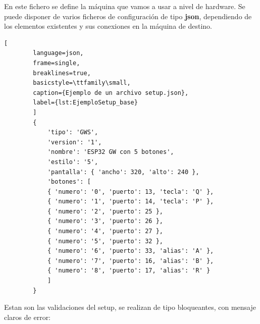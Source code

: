 	En este fichero se define la máquina que vamos a usar a nivel de hardware.
	Se puede disponer de varios ficheros de configuración de tipo \textbf{json}, dependiendo de los elementos existentes y sus conexiones en la máquina de destino. 
		
	\begin{lstlisting}[
		language=json, 
		frame=single, 
		breaklines=true, 
		basicstyle=\ttfamily\small,
		caption={Ejemplo de un archivo setup.json},
		label={lst:EjemploSetup_base}
		]
		{
			'tipo': 'GWS',                                       
			'version': '1',                                   
			'nombre': 'ESP32 GW con 5 botones',                 
			'estilo': '5',                                      
			'pantalla': { 'ancho': 320, 'alto': 240 },          
			'botones': [                                        
			{ 'numero': '0', 'puerto': 13, 'tecla': 'Q' },  
			{ 'numero': '1', 'puerto': 14, 'tecla': 'P' },  
			{ 'numero': '2', 'puerto': 25 },                
			{ 'numero': '3', 'puerto': 26 },                
			{ 'numero': '4', 'puerto': 27 },
			{ 'numero': '5', 'puerto': 32 },
			{ 'numero': '6', 'puerto': 33, 'alias': 'A' },
			{ 'numero': '7', 'puerto': 16, 'alias': 'B' },
			{ 'numero': '8', 'puerto': 17, 'alias': 'R' }
			]
		}
	\end{lstlisting}
	
	Estan son las validaciones del setup, se realizan de tipo bloqueantes, con mensaje claros de error:
	
